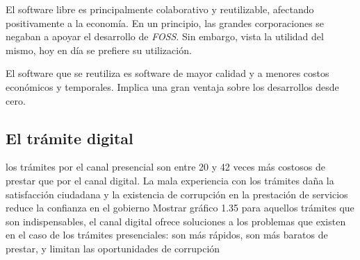El software libre es principalmente colaborativo y reutilizable, afectando
positivamente a la economía. En un principio, las grandes corporaciones se
negaban a apoyar el desarrollo de \textit{FOSS}. Sin embargo, vista la utilidad
del mismo, hoy en día se prefiere su utilización.

El software que se reutiliza es software de mayor calidad y a menores costos
económicos y temporales. Implica una gran ventaja sobre los desarrollos desde
cero.

\subsection{El trámite digital}
los trámites por el canal presencial son entre 20 y 42 veces más costosos de prestar que por el canal digital\cite[70]{rosethFinTramiteEterno2018}.
La mala experiencia con los trámites daña la satisfacción ciudadana y la existencia de corrupción en la prestación de servicios reduce la confianza en el gobierno\cite[71]{rosethFinTramiteEterno2018}
Mostrar gráfico 1.35
para aquellos trámites que son indispensables, el canal digital ofrece soluciones a los problemas que existen en el caso de los trámites presenciales: son más rápidos, son más baratos de prestar, y limitan las oportunidades de corrupción \cite[99]{rosethFinTramiteEterno2018}

